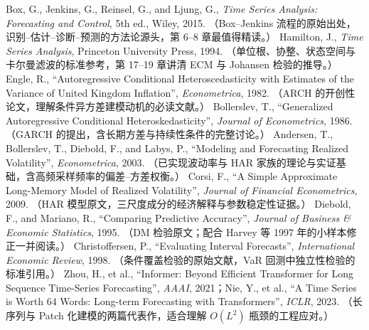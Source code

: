 \begin{furtherreading}
 Box, G., Jenkins, G., Reinsel, G., and Ljung, G., \emph{Time Series Analysis:
Forecasting and Control}, 5th ed., Wiley, 2015.
（Box--Jenkins 流程的原始出处，识别--估计--诊断--预测的方法论源头，第 6--8 章最值得精读。）
 Hamilton, J., \emph{Time Series Analysis}, Princeton University Press, 1994.
（单位根、协整、状态空间与卡尔曼滤波的标准参考，第 17--19 章讲清 ECM 与 Johansen 检验的推导。）
 Engle, R., ``Autoregressive Conditional Heteroscedasticity with Estimates of the
Variance of United Kingdom Inflation'', \emph{Econometrica}, 1982.
（ARCH 的开创性论文，理解条件异方差建模动机的必读文献。）
 Bollerslev, T., ``Generalized Autoregressive Conditional Heteroskedasticity'',
\emph{Journal of Econometrics}, 1986.
（GARCH 的提出，含长期方差与持续性条件的完整讨论。）
 Andersen, T., Bollerslev, T., Diebold, F., and Labys, P., ``Modeling and Forecasting
Realized Volatility'', \emph{Econometrica}, 2003.
（已实现波动率与 HAR 家族的理论与实证基础，含高频采样频率的偏差--方差权衡。）
 Corsi, F., ``A Simple Approximate Long-Memory Model of Realized Volatility'',
\emph{Journal of Financial Econometrics}, 2009.
（HAR 模型原文，三尺度成分的经济解释与参数稳定性证据。）
 Diebold, F., and Mariano, R., ``Comparing Predictive Accuracy'',
\emph{Journal of Business \& Economic Statistics}, 1995.
（DM 检验原文；配合 Harvey 等 1997 年的小样本修正一并阅读。）
 Christoffersen, P., ``Evaluating Interval Forecasts'', \emph{International Economic
Review}, 1998.
（条件覆盖检验的原始文献，VaR 回测中独立性检验的标准引用。）
 Zhou, H., et al., ``Informer: Beyond Efficient Transformer for Long Sequence
Time-Series Forecasting'', \emph{AAAI}, 2021；Nie, Y., et al., ``A Time Series is Worth
64 Words: Long-term Forecasting with Transformers'', \emph{ICLR}, 2023.
（长序列与 Patch 化建模的两篇代表作，适合理解 $O(L^2)$ 瓶颈的工程应对。）
\end{furtherreading}

